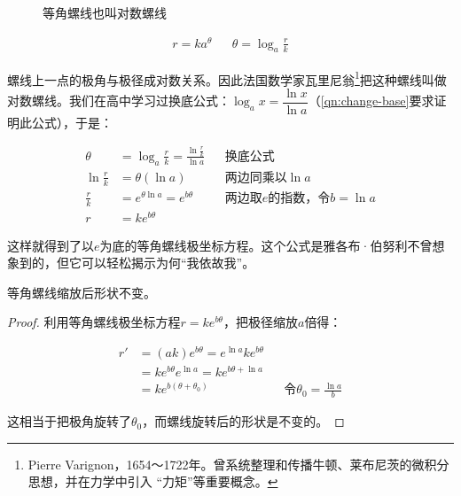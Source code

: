 \documentclass[b5paper]{ctexart}
\begin{document}
\begin{figure}[htbp]
 \centering
  \caption{等角螺线也叫对数螺线}
  \label{fig:equiangular-spiral}
\end{figure}

\begin{align*}
r = ka^\theta && \theta = \log_{a} \frac{r}{k}
\end{align*}

  
螺线上一点的极角与极径成对数关系。因此法国数学家瓦里尼翁\footnote{Pierre Varignon，1654～1722年。曾系统整理和传播牛顿、莱布尼茨的微积分思想，并在力学中引入 “力矩”等重要概念。}把这种螺线叫做对数螺线。我们在高中学习过换底公式：$\log_a x = \dfrac{\ln x}{\ln a}$（\cref{qn:change-base}要求证明此公式），于是：

\begin{align*}
\theta &= \log_a \frac{r}{k} = \frac{\ln \frac{r}{k}}{\ln a} && \text{换底公式}\\
\ln \frac{r}{k} &= \theta(\ln a) && \text{两边同乘以}\ln a \\
\frac{r}{k} &= e^{\theta \ln a} = e^{b\theta} && \text{两边取}e\text{的指数，令}b = \ln a \\
r &= k e^{b\theta}
\end{align*}

这样就得到了以$e$为底的等角螺线极坐标方程。这个公式是雅各布·伯努利不曾想象到的，但它可以轻松揭示为何“我依故我”。

\begin{proposition}
等角螺线缩放后形状不变。
\end{proposition}

\begin{proof}
利用等角螺线极坐标方程$r = ke^{b\theta}$，把极径缩放$a$倍得：

\begin{align*}
r' &= (ak)e^{b\theta} = e^{\ln a} k e^{b\theta} \\
   &= ke^{b\theta}e^{\ln a} = k e^{b\theta + \ln a} \\
   &= ke^{b(\theta + \theta_0)} && \text{令} \theta_0 = \frac{\ln a}{b}
\end{align*}

这相当于把极角旋转了$\theta_0$，而螺线旋转后的形状是不变的。
\end{proof}
\end{document}
